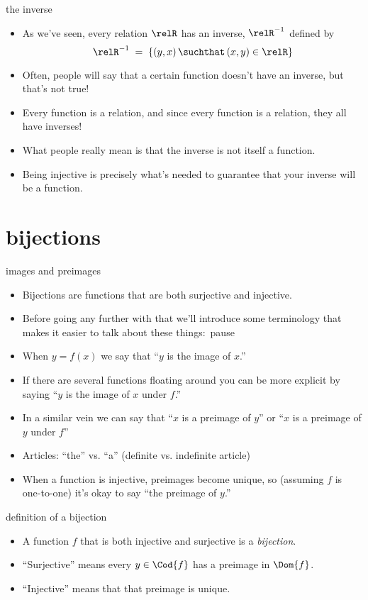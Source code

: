 \documentclass[handout,landscape]{beamer}
\begin{document}
\begin{frame}{the inverse}
\begin{itemize}
\item As we've seen, every relation $\relR$ has an inverse, $\relR^{-1}$ defined by
\[ \relR^{-1} \; = \; \{ (y,x) \, \suchthat \, (x,y) \in \relR \} \]
\pause
\item Often, people will say that a certain function doesn't have an inverse, but that's not true! \pause
\item Every function is a relation, and since every function is a relation, they all have inverses! \pause
\item What people really mean is that the inverse is not itself a function. \pause
\item Being injective is precisely what's needed to guarantee that your inverse will be a function.
\end{itemize}
\end{frame}

\section{bijections}

\begin{frame}{images and preimages}
\begin{itemize}
\item Bijections are functions that are both surjective and injective. \pause
\item Before going any further with that we'll introduce some terminology that makes it easier to talk about these things:\ pause
\item When $y = f(x)$ we say that ``$y$ is the image of $x$.'' \pause
\item If there are several functions floating around you can be more explicit by saying \newline
``$y$ is the image of $x$ under $f$.'' \pause
\item In a similar vein we can say that ``$x$ is a preimage of $y$'' or  ``$x$ is a preimage of $y$ under $f$'' 
\item Articles: ``the'' vs. ``a'' \pause (definite vs. indefinite article) \pause
\item When a function is injective, preimages become unique, so (assuming $f$ is one-to-one) it's okay to say ``the preimage of $y$.''
\end{itemize}
\end{frame}

\begin{frame}{definition of a bijection}
\begin{itemize}
\item A function $f$ that is both injective and surjective is a {\em bijection}. \pause
\item ``Surjective'' means every $y \in \Cod{f}$ has a preimage in $\Dom{f}$. \pause
\item ``Injective'' means that that preimage is unique. \pause
\end{itemize}
\end{frame}
\end{document}
